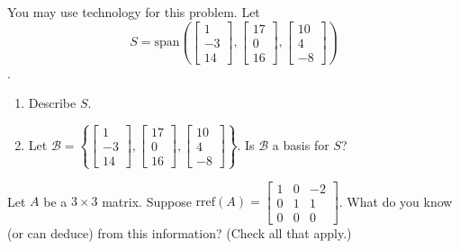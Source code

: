 \documentclass{ximera}
\begin{document}
\begin{exercise}
You may use technology for this problem.  Let $$S=\text{span}\left(\begin{bmatrix}1\\-3\\14\end{bmatrix},\begin{bmatrix}17\\0\\16\end{bmatrix},\begin{bmatrix}10\\4\\-8\end{bmatrix}\right)$$.
\begin{enumerate}
    \item Describe $S$.
    \begin{multipleChoice}
    \end{multipleChoice}

    \item Let $\mathcal{B}=\left\{\begin{bmatrix}1\\-3\\14\end{bmatrix},\begin{bmatrix}17\\0\\16\end{bmatrix},\begin{bmatrix}10\\4\\-8\end{bmatrix}\right\}$.  Is $\mathcal{B}$ a basis for $S$?
    \begin{multipleChoice}
    \end{multipleChoice}
\end{enumerate}

\end{exercise}

\begin{exercise}
    Let $A$ be a $3\times 3$ matrix.  Suppose $\text{rref}(A)=\begin{bmatrix}1 & 0 &-2\\0 & 1 & 1\\0 & 0& 0\end{bmatrix}$.  What do you know (or can deduce) from this information? (Check all that apply.)
    \begin{selectAll}
    \end{selectAll}
\end{exercise}
\end{document}
